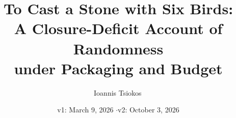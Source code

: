 \documentclass[11pt]{article}
\title{To Cast a Stone with Six Birds:\texorpdfstring{\\[4pt]}{ }%
A Closure-Deficit Account of Randomness\texorpdfstring{\\}{ }%
under Packaging and Budget}
\author{Ioannis Tsiokos\,\orcidlink{0009-0009-7659-5964}}
\date{v1: March 9, 2026 \quad$\cdot$\quad v2: October 3, 2026}
\begin{document}
\maketitle
\thispagestyle{firstpage}

\begin{abstract}

\end{abstract}










\appendix







\end{document}
